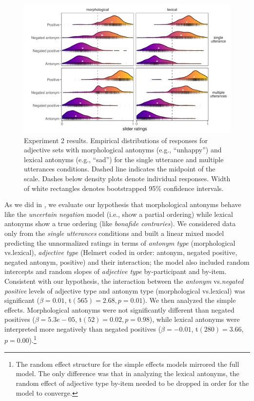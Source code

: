 \documentclass[floatsintext,doc]{apa6}
\let\rmarkdownfootnote\footnote%
\def\footnote{\protect\rmarkdownfootnote}
\begin{document}
\begin{figure}[h]
\centering \includegraphics[width=0.95\linewidth]{figs/expt2_ridges_wCIs} 
\caption{Experiment 2 results. Empirical distributions of responses for adjective sets with morphological antonyms (e.g., ``unhappy'') and lexical antonyms (e.g., ``sad'') for the single utterance and multiple utterances conditions. Dashed line indicates the midpoint of the scale. Dashes below density plots denote individual responses. Width of white rectangles denotes bootstrapped 95\% confidence intervals.}
\label{fig:expt2-results}
\end{figure}

As we did in , we evaluate our hypothesis that morphological antonyms behave like the \emph{uncertain negation} model (i.e., show a partial ordering) while lexical antonyms show a true ordering (like \emph{bonafide contraries}).
We considered data only from the \emph{single utterances} conditions and built a linear mixed model predicting the unnormalized ratings in terms of \emph{antonym type} (morphological vs.\text{~}lexical), \emph{adjective type} (Helmert coded in order: antonym, negated positive, negated antonym, positive) and their interaction; the model also included random intercepts and random slopes of \emph{adjective type} by-participant and by-item.
Consistent with our hypothesis, the interaction between the \emph{antonym} vs.\text{~}\emph{negated positive} levels of adjective type and antonym type (morphological vs.\text{~}lexical) was significant (\(\beta = 0.01\), t\((565) = 2.68, p = 0.01\)).
We then analyzed the simple effects.
Morphological antonyms were not significantly different than negated positives (\(\beta = 5.3e-05\), t\((52) = 0.02, p = 0.98\)), while lexical antonyms were interpreted more negatively than negated positives (\(\beta = -0.01\), t\((280) = 3.66\),
\(p = 0.00\)).\footnote{The random effect structure for the simple effects models mirrored the full model. The only difference was that in analyzing the lexical antonyms, the random effect of adjective type by-item needed to be dropped in order for the model to converge.}
\end{document}
